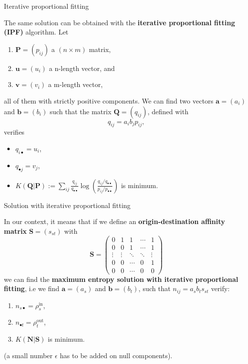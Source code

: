 \documentclass[10pt]{beamer}
\newcommand{\imp}[1]{\textbf{\color{cyan}#1}}
\begin{document}
	
	\begin{frame}{Iterative proportional fitting}
	
	The same solution can be obtained with the \imp{iterative proportional fitting (IPF)} algorithm. Let 
	\begin{enumerate}
		\item $\mathbf{P} = (p_{ij})$ a $(n \times m)$ matrix, 
		\item $\mathbf{u} = (u_i)$ a n-length vector, and 
		\item $\mathbf{v} = (v_i)$ a m-length vector,
	\end{enumerate}
	all of them with strictly positive components. We can find two vectors $\mathbf{a} = (a_i)$ and $\mathbf{b} = (b_i)$ such that the matrix $\mathbf{Q} = (q_{ij})$, defined with
	$$
		q_{ij} = a_i b_j p_{ij},
	$$
	verifies
	\begin{itemize}
		\item $q_{i\bullet} = u_i$,
		\item $q_{\bullet j} = v_j$,
		\item $K(\mathbf{Q}| \mathbf{P}) := \sum_{ij} \frac{q_{ij}}{q_{\bullet \bullet}} \log \left( \frac{q_{ij} / q_{\bullet \bullet}}{p_{ij} / p_{\bullet \bullet}} \right)$ is minimum.
	\end{itemize}
	\end{frame}
	
	
	\begin{frame}{Solution with iterative proportional fitting}
		
		In our context, it means that if we define an \imp{origin-destination affinity matrix} $\mathbf{S} = (s_{st})$ with 
			$$
				\mathbf{S} = \left( \begin{array}{ccccc}
				0 & 1 & 1 & \cdots & 1 \\
				0 & 0 & 1 & \cdots & 1 \\
				\vdots & \vdots & \ddots & \ddots & \vdots \\
				0 & 0 & \cdots & 0 & 1 \\
				0 & 0 & \cdots & 0 & 0 
				\end{array} \right)
			$$
		we can find the \imp{maximum entropy solution with iterative proportional fitting}, i.e we find $\mathbf{a} = (a_s)$ and $\mathbf{b} = (b_t)$, such that $n_{ij} = a_s b_t s_{st}$ verify:
		\begin{enumerate}
			\item $n_{s\bullet} = \rho^\text{in}_s$,
			\item $n_{\bullet t} = \rho^\text{out}_t$,
			\item $K(\mathbf{N}| \mathbf{S})$ is minimum.
		\end{enumerate}
		\small (a small number $\epsilon$ has to be added on null components).
	\end{frame}
	
\end{document}
